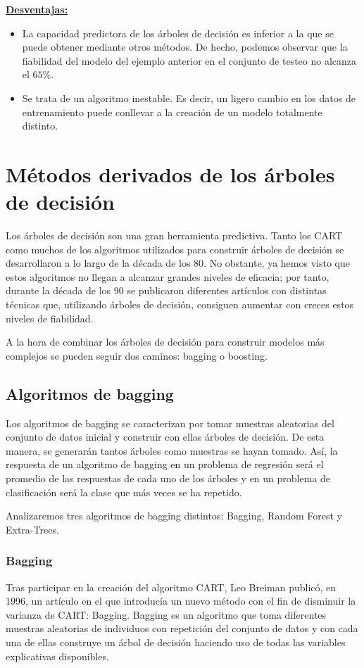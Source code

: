 \documentclass[12pt,twoside]{article}
\begin{document}
\textbf{\underline{Desventajas:}}
\begin{itemize}
\item La capacidad predictora de los árboles de decisión es inferior a la que se puede obtener mediante otros métodos. De hecho, podemos observar que la fiabilidad del modelo del ejemplo anterior en el conjunto de testeo no alcanza el $65\%$.
\item Se trata de un algoritmo inestable. Es decir, un ligero cambio en los datos de entrenamiento puede conllevar a la creación de un modelo totalmente distinto. %
\end{itemize}



\newpage
\section{Métodos derivados de los árboles de decisión}
Los árboles de decisión son una gran herramienta predictiva. Tanto los CART como muchos de los algoritmos utilizados para construir árboles de decisión se desarrollaron a lo largo de la década de los 80. No obstante, ya hemos visto que estos algoritmos no llegan a alcanzar grandes niveles de eficacia; por tanto, durante la década de los 90 se publicaron diferentes artículos con distintas técnicas que, utilizando árboles de decisión, consiguen aumentar con creces estos niveles de fiabilidad.

A la hora de combinar los árboles de decisión para construir modelos más complejos se pueden seguir dos caminos: bagging o boosting.


\subsection{Algoritmos de bagging}
Los algoritmos de bagging se caracterizan por tomar muestras aleatorias del conjunto de datos inicial y construir con ellas árboles de decisión. De esta manera, se generarán tantos árboles como muestras se hayan tomado. Así, la respuesta de un algoritmo de bagging en un problema de regresión será el promedio de las respuestas de cada uno de los árboles y en un problema de clasificación será la clase que más veces se ha repetido.

Analizaremos tres algoritmos de bagging distintos: Bagging, Random Forest y Extra-Trees.


\subsubsection{Bagging}
Tras participar en la creación del algoritmo CART, Leo Breiman publicó, en 1996, un artículo en el que introducía un nuevo método con el fin de disminuir la varianza de CART: Bagging. Bagging es un algoritmo que toma diferentes muestras aleatorias de individuos con repetición del conjunto de datos y con cada una de ellas construye un árbol de decisión haciendo uso de todas las variables explicativas disponibles.
\end{document}
